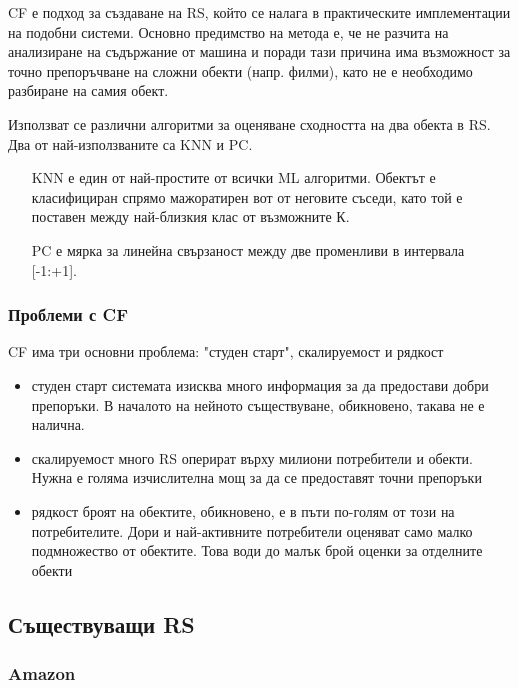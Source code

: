 		\ac{CF} е подход за създаване на \ac{RS}, който се налага в практическите имплементации на подобни системи. Основно предимство
		на метода е, че не разчита на анализиране на съдържание от машина и поради тази причина има възможност за точно препоръчване на
		сложни обекти (напр. филми), като не е необходимо разбиране на самия обект.
		
		Използват се различни алгоритми за оценяване сходността на два обекта в \ac{RS}. Два от най-използваните са \ac{KNN} и \ac{PC}.
		
		\begin{itemize}
			\item[\ac{KNN}] е един от най-простите от всички \ac{ML} алгоритми. Обектът е класифициран спрямо мажоратирен вот от неговите съседи, като той е поставен между най-близкия клас от възможните К.
			\item[\ac{PC}] е мярка за линейна свързаност между две променливи в интервала [-1:+1].
		\end{itemize}
		
	\subsubsection{Проблеми с \ac{CF}}
		
		\ac{CF} има три основни проблема: "студен старт", скалируемост и рядкост
		
		\begin{itemize}
			\item студен старт системата изисква много информация за да предостави добри препоръки. В началото на нейното съществуване, обикновено, такава не е налична.
			\item скалируемост много \ac{RS} оперират върху милиони потребители и обекти. Нужна е голяма изчислителна мощ за да се предоставят точни препоръки
			\item рядкост броят на обектите, обикновено, е в пъти по-голям от този на потребителите. Дори и най-активните потребители оценяват само малко подмножество от обектите. Това води до малък брой оценки за отделните обекти
		\end{itemize}
		
	\subsection{Съществуващи \ac{RS}}
	
		\subsubsection{Amazon}
		
